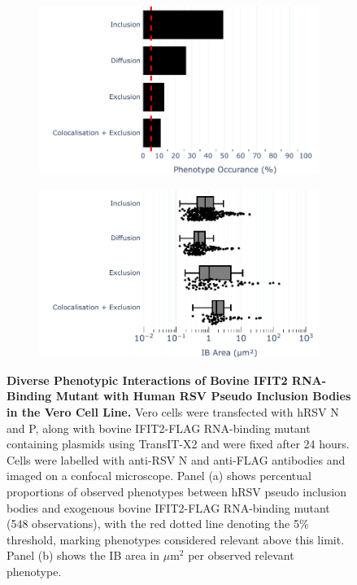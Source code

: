 \begin{figure}
    \begin{subfigure}{0.495\textwidth}
        \caption{}
        \includegraphics[width=1\linewidth]{09. Chapter 4/Figs/01. pIB/03. IFIT2/05. IFIT2-RNA binding mutant/02. pIB/01. bar_bi2f24_hnhp.pdf} 
    \end{subfigure}
    \begin{subfigure}{0.495\textwidth}
        \caption{}
        \includegraphics[width=1\linewidth]{09. Chapter 4/Figs/01. pIB/03. IFIT2/05. IFIT2-RNA binding mutant/02. pIB/02. box_bi2f24_hnhp.pdf}
    \end{subfigure}
    \caption[Diverse Phenotypic Interactions of Bovine IFIT2 RNA-Binding Mutant with Human RSV Pseudo Inclusion Bodies in the Vero Cell Line.]{\textbf{Diverse Phenotypic Interactions of Bovine IFIT2 RNA-Binding Mutant with Human RSV Pseudo Inclusion Bodies in the Vero Cell Line.} Vero cells were transfected with hRSV N and P, along with bovine IFIT2-FLAG RNA-binding mutant containing plasmids using TransIT-X2 and were fixed after 24 hours. Cells were labelled with anti-RSV N and anti-FLAG antibodies and imaged on a confocal microscope. Panel (a) shows percentual proportions of observed phenotypes between hRSV pseudo inclusion bodies and exogenous bovine IFIT2-FLAG RNA-binding mutant (548 observations), with the red dotted line denoting the 5\% threshold, marking phenotypes considered relevant above this limit. Panel (b) shows the IB area in \(\mu \mbox{m}^2\) per observed relevant phenotype.}
    \label{fig:Diverse Phenotypic Interactions of Bovine IFIT2 RNA-Binding Mutant with Human RSV Pseudo Inclusion Bodies in the Vero Cell Line}
\end{figure}

